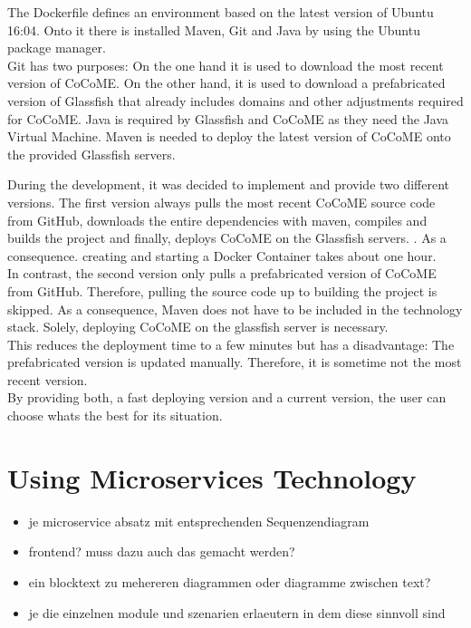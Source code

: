 	The Dockerfile defines an environment based on the latest version of Ubuntu 16:04. Onto it there is installed Maven, Git and Java by using the Ubuntu package manager.\\
	Git has two purposes: On the one hand it is used to download the most recent version of CoCoME.	On the other hand, it is used to download a prefabricated version of Glassfish that already includes domains and other adjustments required for CoCoME. Java is required by Glassfish and CoCoME as they need the Java Virtual Machine. Maven is needed to deploy the latest version of CoCoME onto the provided Glassfish servers.
	
	
	During the development, it was decided to implement and provide two different versions. The first version always pulls the most recent CoCoME source code from GitHub, downloads the entire dependencies with maven, compiles and builds the project and finally, deploys CoCoME on the Glassfish servers. . As a consequence. creating and starting a Docker Container takes about one hour.\\
	In contrast, the second version only  pulls a prefabricated version of CoCoME from GitHub. Therefore, pulling the source code up to building the project is skipped. As a consequence, Maven does not have to be included in the technology stack. Solely, deploying CoCoME on the glassfish server is necessary.\\
	This reduces the deployment time to a few minutes but has a disadvantage: The prefabricated version is updated manually. Therefore, it is sometime not the most recent version.\\
	By providing both, a fast deploying version and a current version, the user can choose whats the best for its situation.
	

	

	
\section{Using Microservices Technology} \label{MS}
	\begin{itemize}
		\item je microservice absatz mit entsprechenden Sequenzendiagram %
		\item frontend? muss dazu auch das gemacht werden?
		\item ein blocktext zu mehereren diagrammen oder diagramme zwischen text?
		
	
			\item je die einzelnen module und szenarien erlaeutern in dem diese sinnvoll sind
	\end{itemize}
	
